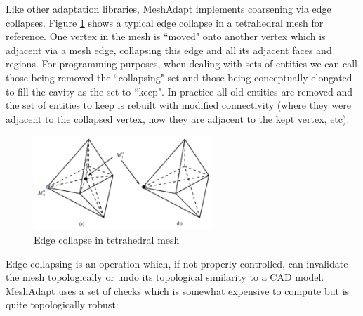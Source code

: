 Like other adaptation libraries, MeshAdapt implements
coarsening via edge collapses.
Figure \ref{fig:collapse} shows a typical edge collapse
in a tetrahedral mesh for reference.
One vertex in the mesh is ``moved" onto another vertex which is adjacent
via a mesh edge, collapsing this edge and all its adjacent
faces and regions.
For programming purposes, when dealing with sets of entities we
can call those being removed the ``collapsing" set and those being
conceptually elongated to fill the cavity as the set to ``keep".
In practice all old entities are removed and the set of entities to keep
is rebuilt with modified connectivity (where they were adjacent to the
collapsed vertex, now they are adjacent to the kept vertex, etc).

\begin{figure}
\begin{center}
\includegraphics[width=0.6\textwidth]{collapse.png}
\caption{Edge collapse in tetrahedral mesh
\cite{lu2011developments}}
\label{fig:collapse}
\end{center}
\end{figure}

Edge collapsing is an operation which, if not properly controlled,
can invalidate the mesh topologically or undo its topological similarity
to a CAD model.
MeshAdapt uses a set of checks which is somewhat expensive to compute
but is quite topologically robust:


